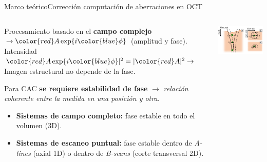 \documentclass[fleqn,10pt,aspectratio=169,dvipsnames]{beamer}
\begin{document}
\begin{frame}[c]{Marco teórico}{Corrección computación de aberraciones en OCT}
	\begin{columns}
		\begin{column}{.74\textwidth}
{\footnotesize
{Procesamiento basado en el \textbf{campo complejo} $\rightarrow {\color{red}A}\exp\{i{\color{blue}\phi}\}$ ({\color{red}amplitud} y {\color{blue}fase}).
Intensidad ${\color{red}A}\exp\{i{\color{blue}\phi}\}|^2 = |{\color{red}A}|^2 \rightarrow$ Imagen estructural no depende de la fase. \\
}

\vspace{\baselineskip}
Para CAC \textbf{se requiere estabilidad de fase} $\rightarrow$ \textit{relación coherente entre la medida en una posición y otra.} \\
\vspace{\baselineskip}
			\begin{itemize}
\item \textbf{Sistemas de campo completo:} fase estable en todo el {\color{ForestGreen}volumen (3D)}. \\
\item \textbf{Sistemas de escaneo puntual:} fase estable dentro de \textit{A-lines} ({\color{red}axial 1D}) o dentro de \textit{B-scans} ({\color{red}corte transversal 2D}). \\
			\end{itemize}
}
		\end{column}
	\begin{column}{.25\textwidth}
\includegraphics[width=\textwidth]{Figuras/Scanning_point.png}
	\end{column}
	\end{columns}
{\small
}
\end{frame}
\end{document}
